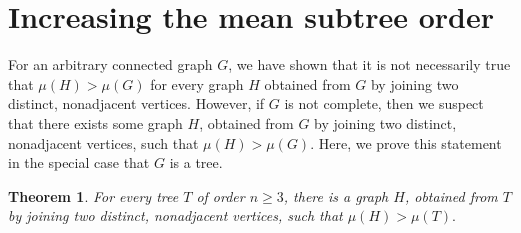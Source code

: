 \documentclass[12pt]{article}
\newtheorem{theorem}{Theorem}[section]
\theoremstyle{definition}
\begin{document}
\section{Increasing the mean subtree order}\label{TreeSection}

For an arbitrary connected graph $G$, we have shown that it is not necessarily true that $\mu(H)>\mu(G)$ for every graph $H$ obtained from $G$ by joining two distinct, nonadjacent vertices.  However, if $G$ is not complete, then we suspect that there exists some graph $H$, obtained from $G$ by joining two distinct, nonadjacent vertices, such that $\mu(H)>\mu(G)$.  Here, we prove this statement in the special case that $G$ is a tree.

\begin{theorem}
For every tree $T$ of order $n\geq 3$, there is a graph $H$, obtained from $T$ by joining two distinct, nonadjacent vertices, such that $\mu(H)>\mu(T).$
\end{theorem}
\end{document}

